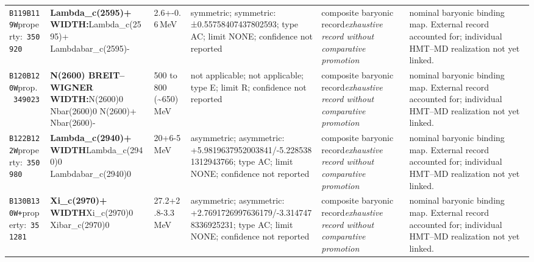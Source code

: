 \begin{landscape}
\begin{longtable}{L{1.85cm}L{4.45cm}L{2.35cm}L{4.05cm}L{3.35cm}L{7.15cm}}
\texttt{B119}\newline \texttt{B119W}\newline property:\ \texttt{350920} & \textbf{Lambda\_\allowbreak{}c(2595)+ WIDTH:}\newline Lambda\_\allowbreak{}c(2595)+ \textbar{}\allowbreak{} Lambdabar\_\allowbreak{}c(2595)- & 2.6+-0.6\,MeV & symmetric; symmetric: ±0.55758407437802593; type AC; limit NONE; confidence not reported & composite baryonic record\newline \emph{exhaustive record without comparative promotion} & nominal baryonic binding map. External record accounted for; individual HMT--MD realization not yet linked. \\
\texttt{B120}\newline \texttt{B120W}\newline prop.\ \texttt{349023} & \textbf{N(2600) BREIT--WIGNER WIDTH:}\newline N(2600)0 \textbar{}\allowbreak{} Nbar(2600)0 \textbar{}\allowbreak{} N(2600)+ \textbar{}\allowbreak{} Nbar(2600)- & 500 to 800 (\textasciitilde{}650)\,MeV & not applicable; not applicable; type E; limit R; confidence not reported & composite baryonic record\newline \emph{exhaustive record without comparative promotion} & nominal baryonic binding map. External record accounted for; individual HMT--MD realization not yet linked. \\
\texttt{B122}\newline \texttt{B122W}\newline property:\ \texttt{350980} & \textbf{Lambda\_\allowbreak{}c(2940)+ WIDTH}\newline Lambda\_\allowbreak{}c(2940)0 \textbar{}\allowbreak{} Lambdabar\_\allowbreak{}c(2940)0 & 20+6-5\,MeV & asymmetric; asymmetric: +5.9819637952003841/-5.2285381312943766; type AC; limit NONE; confidence not reported & composite baryonic record\newline \emph{exhaustive record without comparative promotion} & nominal baryonic binding map. External record accounted for; individual HMT--MD realization not yet linked. \\
\texttt{B130}\newline \texttt{B130W+}\newline property:\ \texttt{351281} & \textbf{Xi\_\allowbreak{}c(2970)+ WIDTH}\newline Xi\_\allowbreak{}c(2970)0 \textbar{}\allowbreak{} Xibar\_\allowbreak{}c(2970)0 & 27.2+2.8-3.3\,MeV & asymmetric; asymmetric: +2.7691726997636179/-3.3147478336925231; type AC; limit NONE; confidence not reported & composite baryonic record\newline \emph{exhaustive record without comparative promotion} & nominal baryonic binding map. External record accounted for; individual HMT--MD realization not yet linked. \\

\end{longtable}
\end{landscape}

